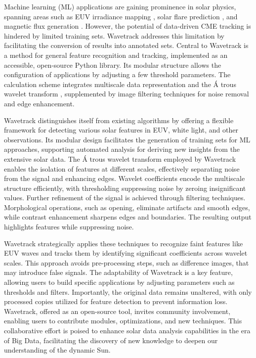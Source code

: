 Machine learning (ML) applications are gaining prominence in solar physics, spanning areas such as EUV irradiance mapping \citep{szenicer_2019}, solar flare prediction \citep{li_2013}, and magnetic flux generation \citep{kim_2019}. However, the potential of data-driven CME tracking is hindered by limited training sets. Wavetrack addresses this limitation by facilitating the conversion of results into annotated sets.
Central to Wavetrack is a method for general feature recognition and tracking, implemented as an accessible, open-source Python library. Its modular structure allows the configuration of applications by adjusting a few threshold parameters. The calculation scheme integrates multiscale data representation \citep{starck_2002} and the \'A trous wavelet transform \citep{akansu_1991, holschneider_1989}, supplemented by image filtering techniques for noise removal and edge enhancement.

Wavetrack distinguishes itself from existing algorithms by offering a flexible framework for detecting various solar features in EUV, white light, and other observations. Its modular design facilitates the generation of training sets for ML approaches, supporting automated analysis for deriving new insights from the extensive solar data. The \'A trous wavelet transform employed by Wavetrack enables the isolation of features at different scales, effectively separating noise from the signal and enhancing edges. Wavelet coefficients encode the multiscale structure efficiently, with thresholding suppressing noise by zeroing insignificant values. Further refinement of the signal is achieved through filtering techniques. Morphological operations, such as opening, eliminate artifacts and smooth edges, while contrast enhancement sharpens edges and boundaries. The resulting output highlights features while suppressing noise.

Wavetrack strategically applies these techniques to recognize faint features like EUV waves and tracks them by identifying significant coefficients across wavelet scales. This approach avoids pre-processing steps, such as difference images, that may introduce false signals. The adaptability of Wavetrack is a key feature, allowing users to build specific applications by adjusting parameters such as thresholds and filters. Importantly, the original data remains unaltered, with only processed copies utilized for feature detection to prevent information loss.
Wavetrack, offered as an open-source tool, invites community involvement, enabling users to contribute modules, optimizations, and new techniques. This collaborative effort is poised to enhance solar data analysis capabilities in the era of Big Data, facilitating the discovery of new knowledge to deepen our understanding of the dynamic Sun.

